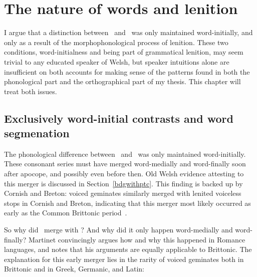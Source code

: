 \chapter{The nature of words and lenition}
\label{cha:some-phon-issu}
I argue that a distinction between \lT\ and \xD\ was only maintained word-initially, and only as a result of the morphophonological process of lenition. These two conditions, word-initialness and being part of grammatical lenition, may seem trivial to any educated speaker of Welsh, but speaker intuitions alone are insufficient on both accounts for making sense of the patterns found in both the phonological part and the orthographical part of my thesis. This chapter will treat both issues.

\section{Exclusively word-initial contrasts and word segmenation}
\label{sec:excl-word-init}
The phonological difference between \lT\ and \xD\ was only maintained word-initially. These consonant series must have merged word-medially and word-finally soon after apocope, and possibly even before then. Old Welsh evidence attesting to this merger is discussed in Section~\ref{bdgwithptc}. This finding is backed up by Cornish and Breton: voiced geminates similarly merged with lenited voiceless stops in Cornish and Breton, indicating that this merger most likely occurred as early as the Common Brittonic period~\autocite[31]{schrijver_old_2011}.


So why did \lT\ merge with \xD? And why did it only happen word-medially and word-finally? Martinet convincingly argues how and why this happened in Romance languages, and notes that his arguments are equally applicable to Brittonic. The explanation for this early merger lies in the rarity of voiced geminates both in Brittonic and in Greek, Germanic, and Latin: 

